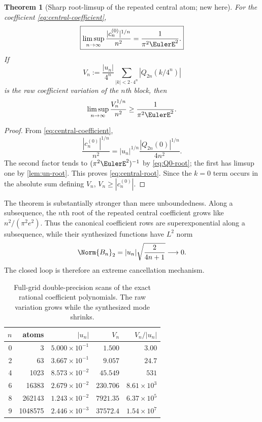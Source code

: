 \documentclass[11pt,oneside]{article}
\numberwithin{equation}{section}
\newtheorem{theorem}{Theorem}[section]
\theoremstyle{definition}
\theoremstyle{remark}
\begin{document}
\begin{theorem}[Sharp root-limsup of the repeated central atom; new here]
\label{thm:central-root}
For the coefficient \eqref{eq:central-coefficient},
\begin{equation}
 \boxed{
 \limsup_{n\to\infty}
 \frac{|c_n^{(0)}|^{1/n}}{n^2}=\frac1{\pi^2\EulerE^2}.}
 \label{eq:central-root}
\end{equation}
If
\begin{equation}
 V_n:=\frac{|u_n|}{4^n}
 \sum_{|k|<2\cdot4^n}|Q_{2n}(k/4^n)|
 \label{eq:block-variation}
\end{equation}
is the raw coefficient variation of the $n$th block, then
\begin{equation}
 \limsup_{n\to\infty}\frac{V_n^{1/n}}{n^2}
 \ge\frac1{\pi^2\EulerE^2}.
 \label{eq:variation-lower}
\end{equation}
\end{theorem}

\begin{proof}
From \eqref{eq:central-coefficient},
\[
 \frac{|c_n^{(0)}|^{1/n}}{n^2}
 =|u_n|^{1/n}
 \frac{|Q_{2n}(0)|^{1/n}}{4n^2}.
\]
The second factor tends to $(\pi^2\EulerE^2)^{-1}$ by
\eqref{eq:Q0-root}; the first has limsup one by
\cref{lem:un-root}.  This proves \eqref{eq:central-root}.  Since the $k=0$
term occurs in the absolute sum defining $V_n$, $V_n\ge|c_n^{(0)}|$.
\end{proof}

The theorem is substantially stronger than mere unboundedness.  Along a
subsequence, the $n$th root of the repeated central coefficient grows like
$n^2/(\pi^2e^2)$.  Thus the canonical coefficient rows are superexponential
along a subsequence, while their synthesized functions have
$L^2$ norm
\begin{equation}
 \Norm{B_n}_2=|u_n|\sqrt{\frac{2}{4n+1}}\longrightarrow0.
 \label{eq:block-small}
\end{equation}
The closed loop is therefore an extreme cancellation mechanism.

\begin{table}[H]
\centering
\small
\begin{tabular}{@{}rrrrr@{}}
\toprule
$n$ & atoms & $|u_n|$ & $V_n$ & $V_n/|u_n|$\\
\midrule
0 & 3 & $5.000\times10^{-1}$ & $1.500$ & $3.00$\\
2 & 63 & $3.667\times10^{-1}$ & $9.057$ & $24.7$\\
4 & 1023 & $8.573\times10^{-2}$ & $45.549$ & $531$\\
6 & 16383 & $2.679\times10^{-2}$ & $230.706$ & $8.61\times10^3$\\
8 & 262143 & $1.243\times10^{-2}$ & $7921.35$ & $6.37\times10^5$\\
9 & 1048575 & $2.446\times10^{-3}$ & $37572.4$ & $1.54\times10^7$\\
\bottomrule
\end{tabular}
\caption{Full-grid double-precision scans of the exact rational coefficient
polynomials.  The raw variation grows while the synthesized mode shrinks.}
\label{tab:variation}
\end{table}
\end{document}
